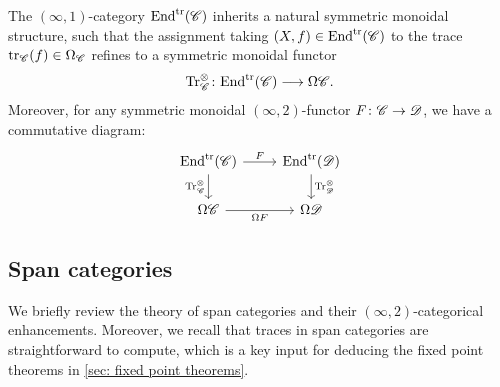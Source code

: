 \begin{thm}\cite[Theorem 1.7]{Hoyois_Scherotzke_Sibilla2017}\label{thm: trace functor}
  The $(\infty,1)$-category $\mathrm{End}^{\mathrm{tr}}(\mathscr{C})$ inherits a natural
  symmetric monoidal structure, such that the assignment taking $(X,f) \in \mathrm{End}^{\mathrm{tr}}(\mathscr{C})$ to the
  trace $\mathrm{tr}_{\mathscr{C}} (f) \in \Omega_{\mathscr{C}}$ refines to a symmetric monoidal functor
  \[ \mathrm{Tr}^{\otimes}_{\mathscr{C}}\colon \mathrm{End}^{\mathrm{tr}}(\mathscr{C}) \longrightarrow \Omega \mathscr{C}.\]
  Moreover, for any symmetric monoidal $(\infty,2)$-functor 
  $F\colon \mathscr{C} \to \mathscr{D}$, we have a commutative diagram:
  \[ \begin{tikzcd}
	{\Endtrl(\cC)} & {\Endtrl(\cD)} \\
	{\Omega \cC} & {\Omega \cD}
	\arrow["F", from=1-1, to=1-2]
	\arrow["{\Trc_{\cC}}"', from=1-1, to=2-1]
	\arrow["{\Trc_{\cD}}", from=1-2, to=2-2]
	\arrow["{\Omega F}"', from=2-1, to=2-2]
\end{tikzcd}\]
\end{thm}



\subsection{Span categories}

We briefly review the theory of span categories and their $(\infty,2)$-categorical enhancements.
Moreover, we recall that traces in span categories are straightforward to compute, which
is a key input for deducing the fixed point theorems in \cref{sec: fixed point theorems}.


